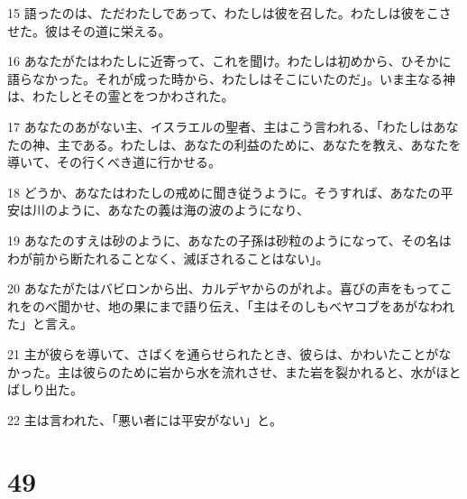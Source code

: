 \par 15 語ったのは、ただわたしであって、わたしは彼を召した。わたしは彼をこさせた。彼はその道に栄える。
\par 16 あなたがたはわたしに近寄って、これを聞け。わたしは初めから、ひそかに語らなかった。それが成った時から、わたしはそこにいたのだ」。いま主なる神は、わたしとその霊とをつかわされた。
\par 17 あなたのあがない主、イスラエルの聖者、主はこう言われる、「わたしはあなたの神、主である。わたしは、あなたの利益のために、あなたを教え、あなたを導いて、その行くべき道に行かせる。
\par 18 どうか、あなたはわたしの戒めに聞き従うように。そうすれば、あなたの平安は川のように、あなたの義は海の波のようになり、
\par 19 あなたのすえは砂のように、あなたの子孫は砂粒のようになって、その名はわが前から断たれることなく、滅ぼされることはない」。
\par 20 あなたがたはバビロンから出、カルデヤからのがれよ。喜びの声をもってこれをのべ聞かせ、地の果にまで語り伝え、「主はそのしもべヤコブをあがなわれた」と言え。
\par 21 主が彼らを導いて、さばくを通らせられたとき、彼らは、かわいたことがなかった。主は彼らのために岩から水を流れさせ、また岩を裂かれると、水がほとばしり出た。
\par 22 主は言われた、「悪い者には平安がない」と。

\chapter{49}

